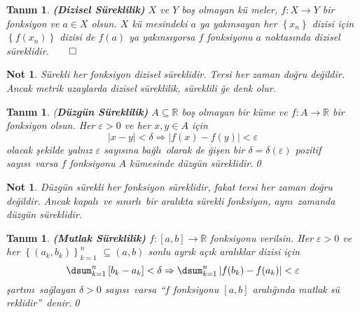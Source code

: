 \documentclass[12pt]{article}
\newtheorem{definition}[theorem]{Tan\i m}
\newtheorem{remark}[theorem]{Not}
\begin{document}
\begin{definition}
\bigskip \textbf{(Dizisel S\"{u}reklilik) } $X$ ve $Y$ bo\c{s} olmayan k\"{u}%
meler, $f:X\rightarrow Y$ bir fonksiyon ve $a\in X$ olsun. $X$ k\"{u}%
mesindeki $a$ ya yak\i nsayan her $\left\{ x_{n}\right\} $ dizisi i\c{c}in $%
\left\{ f(x_{n})\right\} $ dizisi de $f(a)$ ya yak\i ns\i yorsa $f$
fonksiyonu $a$ noktas\i nda dizisel s\"{u}reklidir.$\qed$
\end{definition}

\begin{remark}
S\"{u}rekli her fonksiyon dizisel s\"{u}reklidir. Tersi her zaman do\u{g}ru
de\u{g}ildir. Ancak metrik uzaylarda dizisel s\"{u}reklilik, s\"{u}reklili%
\u{g}e denk olur.
\end{remark}

\begin{definition}
(\textbf{D\"{u}zg\"{u}n S\"{u}reklilik) }$A\subseteq 
\mathbb{R}
$ bo\c{s} olmayan bir k\"{u}me ve $f:A\rightarrow 
\mathbb{R}
$ bir fonksiyon olsun. Her $\varepsilon >0$ ve her $x,y\in A$ i\c{c}in%
\[
\left\vert x-y\right\vert <\delta \Rightarrow \left\vert
f(x)-f(y)\right\vert <\varepsilon 
\]%
olacak \c{s}ekilde yaln\i z $\varepsilon $ say\i s\i na ba\u{g}l\i\ olarak de%
\u{g}i\c{s}en bir $\delta =\delta (\varepsilon )$ pozitif say\i s\i\ varsa $f
$ fonksiyonu $A$ k\"{u}mesinde d\"{u}zg\"{u}n s\"{u}reklidir.\qed
\end{definition}

\begin{remark}
D\"{u}zg\"{u}n s\"{u}rekli her fonksiyon s\"{u}reklidir, fakat tersi her
zaman do\u{g}ru de\u{g}ildir. Ancak kapal\i\ ve s\i n\i rl\i\ bir aral\i kta
s\"{u}rekli fonksiyon, ayn\i\ zamanda d\"{u}zg\"{u}n s\"{u}reklidir.
\end{remark}

\begin{definition}
\textbf{(Mutlak S\"{u}reklilik) }$f:\left[ a,b\right] \rightarrow 
\mathbb{R}
$ fonksiyonu verilsin. Her $\varepsilon >0$ ve her $\left\{
(a_{k},b_{k})\right\} _{k=1}^{n}$ $\subseteq (a,b)$ sonlu ayr\i k a\c{c}\i k
aral\i klar dizisi i\c{c}in%
\[
\dsum_{k=1}^{n}\left[ b_{k}-a_{k}\right] <\delta \Rightarrow
\dsum_{k=1}^{n}\left\vert f(b_{k})-f(a_{k})\right\vert <\varepsilon 
\]%
\c{s}art\i n\i\ sa\u{g}layan $\delta >0$ say\i s\i\ varsa \textquotedblleft $%
f$ fonksiyonu $\left[ a,b\right] $ aral\i \u{g}\i nda mutlak s\"{u}%
reklidir\textquotedblright\ denir.\qed
\end{definition}

\bigskip
\end{document}
